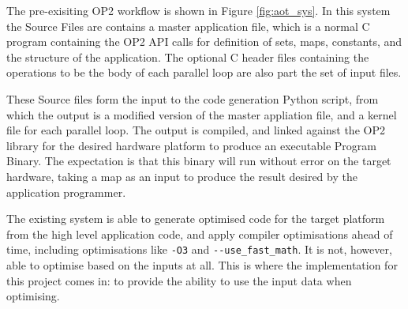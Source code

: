 The pre-exisiting OP2 workflow is shown in Figure \ref{fig:aot_sys}. In this system the Source Files are contains a master application file, which is a normal C program containing the OP2 API calls for definition of sets, maps, constants, and the structure of the application. The optional C header files containing the operations to be the body of each parallel loop are also part the set of input files.
\par
These Source files form the input to the code generation Python script, from which the output is a modified version of the master appliation file, and a kernel file for each parallel loop. The output is compiled, and linked against the OP2 library for the desired hardware platform to produce an executable Program Binary. The expectation is that this binary will run without error on the target hardware, taking a map as an input to produce the result desired by the application programmer.
\par
The existing system is able to generate optimised code for the target platform from the high level application code, and apply compiler optimisations ahead of time, including optimisations like \verb|-O3| and \verb|--use_fast_math|. It is not, however, able to optimise based on the inputs at all. This is where the implementation for this project comes in: to provide the ability to use the input data when optimising.
\vspace{-1.5cm}
